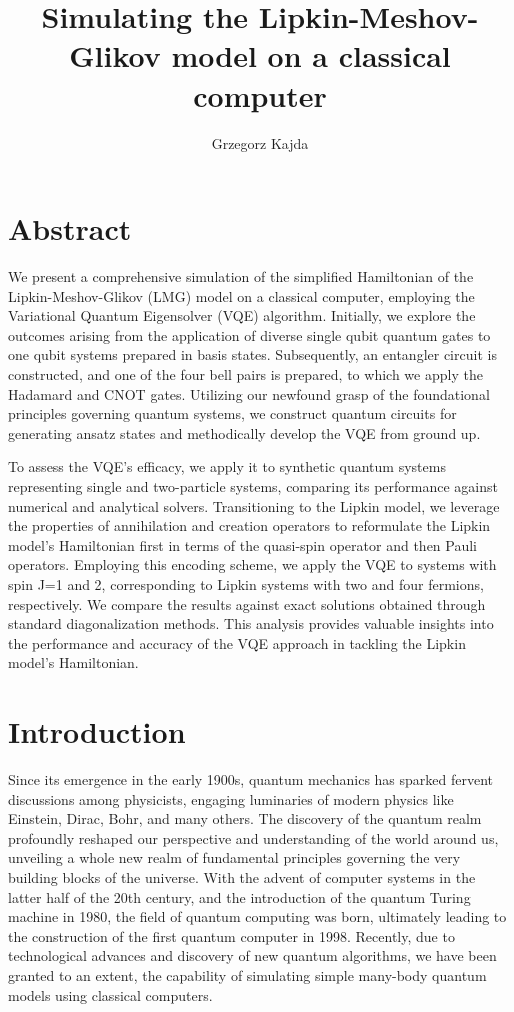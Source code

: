\documentclass[onecolumn,10pt,cleanfoot]{asme2ej}
\author{Grzegorz Kajda
    \affiliation{
	Bachelor Student, Robotics and Intelligent Systems\\ \\[-10pt]
	Department of Informatics The faculty of Mathematics and Natural Sciences\\ \\[-10pt]
    Email: grzegork@ifi.uio.no
    }
}
\begin{document}
\title{Simulating the Lipkin-Meshov-Glikov model on a classical computer}

\maketitle

\section{Abstract}

We present a comprehensive simulation of the simplified Hamiltonian of the Lipkin-Meshov-Glikov (LMG) model on a classical computer, employing the Variational Quantum Eigensolver (VQE) algorithm. Initially, we explore the outcomes arising from the application of diverse single qubit quantum gates to one qubit systems prepared in basis states. Subsequently, an entangler circuit is constructed, and one of the four bell pairs is prepared, to which we apply the Hadamard and CNOT gates. Utilizing our newfound grasp of the foundational principles governing quantum systems, we construct quantum circuits for generating ansatz states and methodically develop the VQE from ground up.

To assess the VQE's efficacy, we apply it to synthetic quantum systems representing single and two-particle systems, comparing its performance against numerical and analytical solvers. Transitioning to the Lipkin model, we leverage the properties of annihilation and creation operators to reformulate the Lipkin model's Hamiltonian first in terms of the quasi-spin operator and then Pauli operators. Employing this encoding scheme, we apply the VQE to systems with spin J=1 and 2, corresponding to Lipkin systems with two and four fermions, respectively. We compare the results against exact solutions obtained through standard diagonalization methods. This analysis provides valuable insights into the performance and accuracy of the VQE approach in tackling the Lipkin model's Hamiltonian.
	

\section{Introduction}
Since its emergence in the early 1900s, quantum mechanics has sparked fervent discussions among physicists, engaging luminaries of modern physics like Einstein, Dirac, Bohr, and many others. The discovery of the quantum realm profoundly reshaped our perspective and understanding of the world around us, unveiling a whole new realm of fundamental principles governing the very building blocks of the universe. With the advent of computer systems in the latter half of the 20th century, and the introduction of the quantum Turing machine in 1980, the field of quantum computing was born, ultimately leading to the construction of the first quantum computer in 1998. Recently, due to technological advances and discovery of new quantum algorithms, we have been granted to an extent, the capability of simulating simple many-body quantum models using classical computers.
\end{document}
